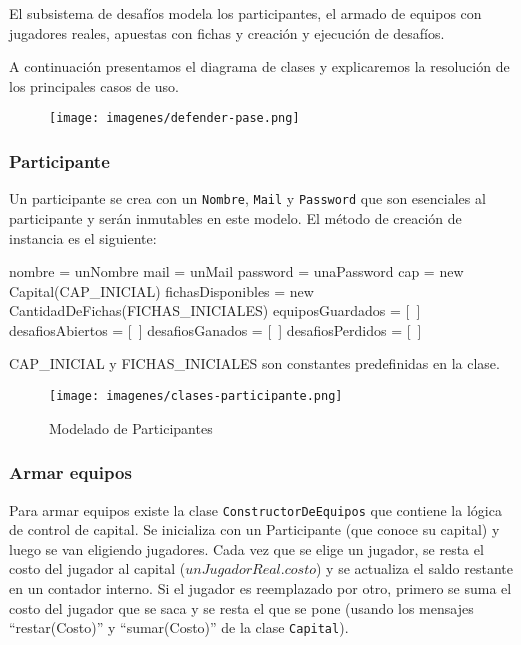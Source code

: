 El subsistema de desaf\'ios modela los participantes, el armado de equipos con jugadores reales, apuestas con fichas y creaci\'on y ejecuci\'on
de desaf\'ios.

A continuaci\'on presentamos el diagrama de clases y explicaremos la resoluci\'on de los principales casos de uso.

\newpage
\begin{landscape}

  \begin{figure}[h!]
   \texttt{[image: imagenes/defender-pase.png]}
   \caption{}
  \end{figure}

\end{landscape}
\newpage


\subsubsection{Participante}
Un participante se crea con un {\tt Nombre}, {\tt Mail} y {\tt Password} que son esenciales al participante y serán inmutables en este modelo.
El método de creación de instancia es el siguiente:

\begin{algorithmic}
	  \State nombre = unNombre
	  \State mail = unMail
	  \State password = unaPassword
	  \State cap = new Capital(CAP\_INICIAL)
	  \State fichasDisponibles = new CantidadDeFichas(FICHAS\_INICIALES)
	  \State equiposGuardados = [\ ]
	  \State desafiosAbiertos = [\ ]
	  \State desafiosGanados = [\ ]
	  \State desafiosPerdidos = [\ ]
	\EndFunction
\end{algorithmic}

CAP\_INICIAL y FICHAS\_INICIALES son constantes predefinidas en la clase.

\begin{figure}[h!]
   \texttt{[image: imagenes/clases-participante.png]}
   \caption{Modelado de Participantes}
\end{figure}

\subsubsection{Armar equipos}
Para armar equipos existe la clase {\tt ConstructorDeEquipos} que contiene la lógica de control de capital. Se inicializa con un Participante (que
conoce su capital) y luego se
van eligiendo jugadores. Cada vez que se elige un jugador, se resta el costo del jugador al capital ($unJugadorReal.costo$) y se actualiza el saldo
restante en un contador interno. Si el jugador
es reemplazado por otro, primero se suma el costo del jugador que se saca y se resta el que se pone (usando los mensajes ``restar(Costo)'' y ``sumar(Costo)''
de la clase {\tt Capital}).

